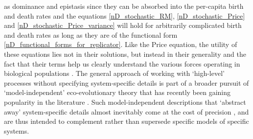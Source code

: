 as dominance and epistasis since they can be absorbed into the per-capita birth and death rates and the equations \eqref{nD_stochastic_RM}, \eqref{nD_stochastic_Price} and \eqref{nD_stochastic_Price_variance} will hold for arbitrarily complicated birth and death rates as long as they are of the functional form \eqref{nD_functional_forms_for_replicator}. Like the Price equation, the utility of these equations lies not in their solutions, but instead in their generality and the fact that their terms help us clearly understand the various forces operating in biological populations \citep{frank_natural_2012,luque_one_2017, luque_mirror_2021}. The general approach of working with `high-level' processes without specifying system-specific details is part of a broader pursuit of `model-independent' eco-evolutionary theory that has recently been gaining popularity in the literature  \citep{grafen_formal_2014, queller_fundamental_2017, doebeli_towards_2017, lion_theoretical_2018, allen_mathematical_2019, rice_universal_2020, week_white_2021, wickman_theoretical_2022, kuosmanen_turnover_2022, mazzolini_universality_2022}. Such model-independent descriptions that `abstract away' system-specific details almost inevitably come at the cost of precision \citep{levins_strategy_1966, potochnik_idealization_2018}, and are thus intended to complement rather than supersede specific models of specific systems.\\
